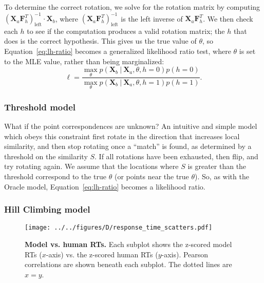 \documentclass[10pt,letterpaper]{article}
\newcommand{\Xa}[0]{\mathbf{X}_a}
\newcommand{\Xb}[0]{\mathbf{X}_b}
\newcommand{\F}[0]{\mathbf{F}}
\newcommand{\hi}[0]{h=0}
\newcommand{\hf}[0]{h=1}
\newcommand{\Oc}[0]{Oracle}
\begin{document}
To determine the correct rotation, we solve for the rotation matrix by
computing $(\Xa \F_h^T)_\mathrm{left}^{-1}\cdot{}\Xb$, where
$(\Xa\F_h^T)_\mathrm{left}^{-1}$ is the left inverse of
$\Xa\F_h^T$. We then check each $h$ to see if the computation produces
a valid rotation matrix; the $h$ that does is the correct
hypothesis. This gives us the true value of $\theta$, so
Equation~\ref{eq:lh-ratio} becomes a generalized likelihood ratio
test, where $\theta$ is set to the MLE value, rather than being
marginalized:
\begin{equation}
  \ell = \frac{\max_\theta p(\Xb\ \vert\ \Xa, \theta, \hi)p(\hi)}{\max_\theta p(\Xb\ \vert\ \Xa, \theta, \hf)p(\hf)}.
  \label{eq:mle-lh-ratio}
\end{equation}

\subsubsection{Threshold model}

What if the point correspondences are unknown? An intuitive and simple
model which obeys this constraint first rotate in the direction that
increases local similarity, and then stop rotating once a ``match'' is
found, as determined by a threshold on the similarity $S$. If all
rotations have been exhausted, then flip, and try rotating again. We
assume that the locations where $S$ is greater than the threshold
correspond to the true $\theta$ (or points near the true
$\theta$). So, as with the \Oc{} model, Equation~\ref{eq:lh-ratio}
becomes a likelihood ratio.

\subsubsection{Hill Climbing model}

\begin{figure*}[t]
  \begin{center}
    \texttt{[image: ../../figures/D/response\_time\_scatters.pdf]}
    \caption{\textbf{Model vs. human RTs.} Each subplot shows the
      z-scored model RTs ($x$-axis) vs. the z-scored human RTs
      ($y$-axis). Pearson correlations are shown beneath each
      subplot. The dotted lines are $x=y$.}
    \label{fig:human-model-scatters}
  \end{center}
\end{figure*}
\end{document}
